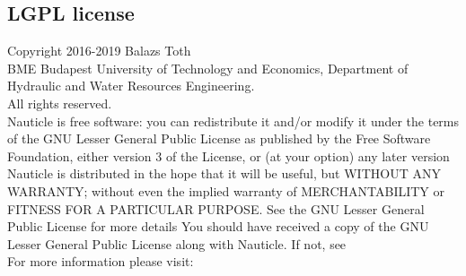 \documentclass[a4paper,12pt,openany]{book}
\newcommand{\myhref}[3][nauticlegreen_dark]{\href{#2}{\color{#1}{#3}}}%
\theoremstyle{break}
\begin{document}
\subsection{LGPL license}
\noindent
Copyright \textcopyright{} 2016-2019 Balazs Toth \\
\noindent
BME Budapest University of Technology and Economics, Department of Hydraulic and Water Resources Engineering.\\
All rights reserved. \\
Nauticle is free software: you can redistribute it and/or modify it under the terms of the GNU Lesser General Public License as published by the Free Software Foundation, either version 3 of the License, or (at your option) any later version Nauticle is distributed in the hope that it will be useful, but WITHOUT ANY WARRANTY; without even the implied warranty of MERCHANTABILITY or FITNESS FOR A PARTICULAR PURPOSE.  See the GNU Lesser General Public License for more details You should have received a copy of the GNU Lesser General Public License along with Nauticle.  If not, see \myhref{http://www.gnu.org/licenses/}{http://www.gnu.org/licenses/}\\
 For more information please visit: \myhref{https://bitbucket.org/Nauticleproject/}{https://bitbucket.org/Nauticleproject/}
\end{document}
